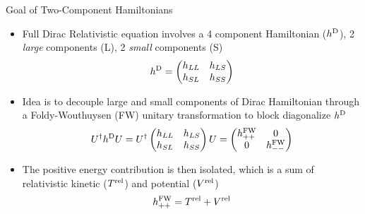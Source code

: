 \documentclass[t]{beamer}
\begin{document}
\begin{frame}{Goal of Two-Component Hamiltonians}
\begin{itemize}
\item Full Dirac Relativistic equation involves a 4 component Hamiltonian ($h^{\rm D}$), 2 \textit{large} components (L), 2 \textit{small} components (S)
\begin{equation}
h^{\rm D} = 
\begin{pmatrix}
h_{LL} & h_{LS} \\
h_{SL} & h_{SS}
\end{pmatrix}
\end{equation}
\item Idea is to decouple large and small components of Dirac Hamiltonian through a Foldy-Wouthuysen (FW) unitary transformation to block diagonalize $h^{\rm D}$
\begin{equation}
U^\dagger h^{\rm D} U = 
U^\dagger
\begin{pmatrix}
h_{LL} & h_{LS} \\
h_{SL} & h_{SS}
\end{pmatrix}
 U
 =
 \begin{pmatrix}
h^{\rm FW}_{++} & 0 \\
0 & h^{\rm FW}_{--}
\end{pmatrix}
\end{equation}
\item The positive energy contribution is then isolated, which is a sum of relativistic kinetic ($T^{\rm rel}$) and potential ($V^{\rm rel}$)
\begin{equation}
h^{\rm FW}_{++} = T^{\rm rel} + V^{\rm rel}
\end{equation}
\end{itemize}
\end{frame}
\end{document}
